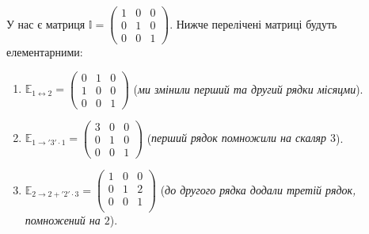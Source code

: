 \documentclass{math_library}
\begin{document}
\begin{example}
	У нас є матриця $\mathbb{I} = \begin{pmatrix}
	1 & 0 & 0 \\
	0 & 1 & 0 \\
	0 & 0 & 1
	\end{pmatrix}$. Нижче перелічені матриці будуть елементарними:
	\begin{enumerate}[nosep,wide=0pt,label={\arabic*)}]
	\item $\mathbb{E}_{1 \leftrightarrow 2} = \begin{pmatrix}
	0 & 1 & 0 \\
	1 & 0 & 0 \\
	0 & 0 & 1 
	\end{pmatrix}$ \quad (\textit{ми змінили перший та другий рядки місяцми}).
	\item $\mathbb{E}_{1 \rightarrow '3' \cdot 1} = \begin{pmatrix}
	3 & 0 & 0 \\
	0 & 1 & 0 \\
	0 & 0 & 1
	\end{pmatrix}$ \quad (\textit{перший рядок помножили на скаляр $3$}).
	\item $\mathbb{E}_{2 \rightarrow 2 + '2'\cdot 3} = \begin{pmatrix}
	1 & 0 & 0 \\
	0 & 1 & 2 \\
	0 & 0 & 1 \\
	\end{pmatrix}$ \quad (\textit{до другого рядка додали третій рядок, помножений на $2$}).
	\end{enumerate}
\end{example}
\end{document}
